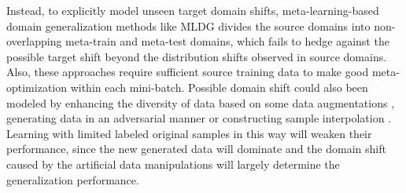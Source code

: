 \documentclass[journal]{IEEEtran}
\begin{document}
Instead, to explicitly model unseen target domain shifts, meta-learning-based domain generalization methods like MLDG \cite{li2018learning}
divides the source domains into non-overlapping meta-train and meta-test domains, which fails to hedge against the possible target shift beyond the distribution shifts observed in source domains.
Also, these approaches require sufficient source training data to make good meta-optimization within each mini-batch.
Possible domain shift could also been modeled by enhancing the diversity of data 
based on some data augmentations \cite{tobin2017domain}, generating data in an adversarial manner \cite{shankar2018generalizing, volpi2018generalizing, zhou2020deep} or constructing sample interpolation \cite{wang2020heterogeneous,zhou2021mixstyle}.
Learning with limited labeled original samples in this way will weaken their performance, since the new generated data will dominate and the domain shift caused by the artificial data manipulations will largely determine the generalization performance. 

\IEEEpubidadjcol
\end{document}
